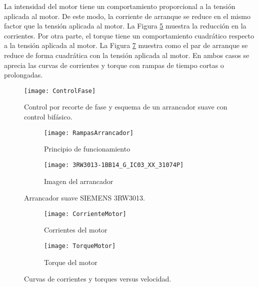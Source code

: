 La intensidad del motor tiene un comportamiento proporcional a la tensión aplicada al motor. De este modo, la corriente de arranque se reduce en el mismo factor que la tensión aplicada al motor. La Figura \ref{fig:corrientemotor} muestra la reducción en la corrientes. Por otra parte, el torque tiene un comportamiento cuadrático respecto a la tensión aplicada al motor. La Figura \ref{fig:torquemotor} muestra como el par de arranque se reduce de forma cuadrática con la tensión aplicada al motor. En ambos casos se aprecia las curvas de corrientes y torque con rampas de tiempo cortas o prolongadas.

\begin{figure}
	\centering
	\texttt{[image: ControlFase]}
	\caption{Control por recorte de fase y esquema de un arrancador suave con control bifásico. \cite{SIEMENS}}
	\label{fig:controlfase}
\end{figure}



\begin{figure}
	\centering
	\begin{subfigure}[b]{0.69\textwidth}
		\centering
		\texttt{[image: RampasArrancador]}
		\caption{Principio de funcionamiento}
		\label{fig:rampasarrancador}
	\end{subfigure}
	\hfill
	\begin{subfigure}[b]{0.3\textwidth}
		\centering
		\texttt{[image: 3RW3013-1BB14\_G\_IC03\_XX\_31074P]}
		\caption{Imagen del arrancador}
		\label{fig:3rw3013-1bb14gic03xx31074p}
		
	\end{subfigure}
	\caption{Arrancador suave SIEMENS 3RW3013.\cite{SIEMENS}}
\end{figure}


\begin{figure}
	\centering
	\begin{subfigure}[b]{0.49\textwidth}
		\centering
		\texttt{[image: CorrienteMotor]}
		\caption{Corrientes del motor}
		\label{fig:corrientemotor}
	\end{subfigure}
	\hfill
	\begin{subfigure}[b]{0.49\textwidth}
		\centering
		\texttt{[image: TorqueMotor]}
		\caption{Torque del motor}
		\label{fig:torquemotor}
		
	\end{subfigure}
	\caption{Curvas de corrientes y torques versus velocidad.\cite{SIEMENS}}
\end{figure}


